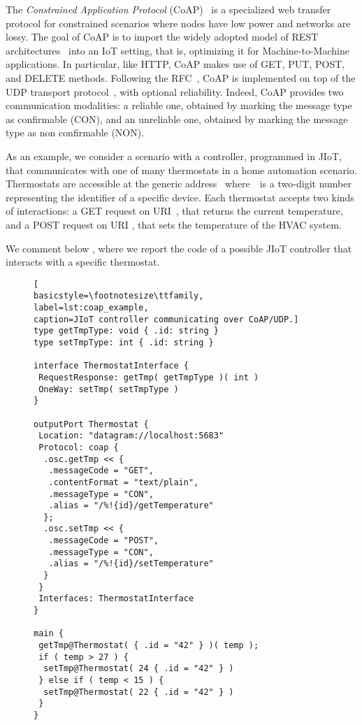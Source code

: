 The \textit{Constrained Application Protocol}
(CoAP)~\cite{coap,doi:10.17487/RFC7252} is a specialized web transfer protocol
for constrained scenarios where nodes have low power and networks are lossy. The
goal of CoAP is to import the widely adopted model of REST
architectures~\cite{fielding00} into an IoT setting, that is, optimizing it for
Machine-to-Machine applications. In particular, like HTTP,
CoAP makes use of GET, PUT,
POST, and DELETE methods.
%
Following the RFC~\cite{doi:10.17487/RFC7252}, CoAP is implemented on top of the
UDP transport protocol~\cite{UDP}, with optional reliability. Indeed, CoAP
provides two communication modalities: a reliable one, obtained by marking the
message type as confirmable (CON), and an unreliable one, obtained by marking the
message type as non confirmable (NON).

As an example, we consider a scenario with a controller, programmed in 
JIoT, that communicates with one of many thermostats 
in a home automation scenario.
Thermostats are accessible at the generic address~ 
where~~is a two-digit number representing the identifier 
of a specific device. 
Each thermostat accepts two kinds of interactions: a GET request on 
URI~,
that returns the current temperature, and a POST
request on URI , 
that sets the temperature of the HVAC system.

We comment below , where we report the code of a
possible JIoT controller that interacts with a specific thermostat.

\begin{figure}[t]
\begin{lstlisting}[
basicstyle=\footnotesize\ttfamily,
label=lst:coap_example,
caption=JIoT controller communicating over CoAP/UDP.]
type getTmpType: void { .id: string }
type setTmpType: int { .id: string }

interface ThermostatInterface {
 RequestResponse: getTmp( getTmpType )( int )
 OneWay: setTmp( setTmpType )
}

outputPort Thermostat {
 Location: "datagram://localhost:5683"
 Protocol: coap {
  .osc.getTmp << {
   .messageCode = "GET",
   .contentFormat = "text/plain",
   .messageType = "CON",
   .alias = "/%!{id}/getTemperature"
  };
  .osc.setTmp << {
   .messageCode = "POST",
   .messageType = "CON",
   .alias = "/%!{id}/setTemperature"  
  }
 }
 Interfaces: ThermostatInterface
}

main {
 getTmp@Thermostat( { .id = "42" } )( temp );
 if ( temp > 27 ) {
  setTmp@Thermostat( 24 { .id = "42" } )
 } else if ( temp < 15 ) {
  setTmp@Thermostat( 22 { .id = "42" } )
 }
}
\end{lstlisting}
\end{figure}

